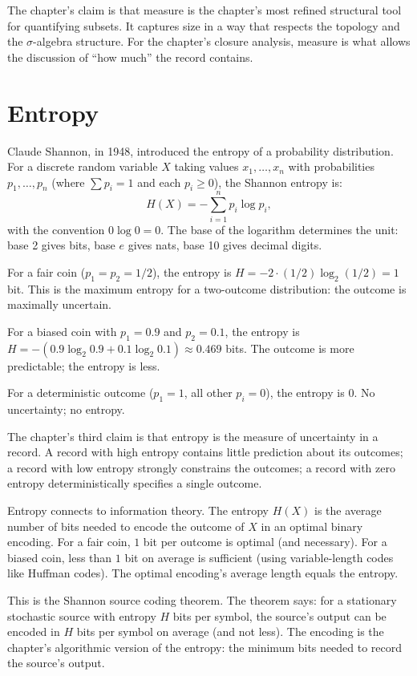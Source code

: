 The chapter's claim is that measure is the chapter's most
refined structural tool for quantifying subsets. It captures
size in a way that respects the topology and the
$\sigma$-algebra structure. For the chapter's closure
analysis, measure is what allows the discussion of ``how
much'' the record contains.

\section{Entropy}
\label{se:entropy}

Claude Shannon, in 1948, introduced the entropy of a probability
distribution. For a discrete random variable $X$ taking values
$x_1, \ldots, x_n$ with probabilities $p_1, \ldots, p_n$ (where
$\sum p_i = 1$ and each $p_i \ge 0$), the Shannon entropy is:
\[
H(X) = -\sum_{i=1}^n p_i \log p_i,
\]
with the convention $0 \log 0 = 0$. The base of the logarithm
determines the unit: base 2 gives bits, base $e$ gives nats, base
10 gives decimal digits.

For a fair coin ($p_1 = p_2 = 1/2$), the entropy is $H = -2 \cdot
(1/2) \log_2(1/2) = 1$ bit. This is the maximum entropy for a
two-outcome distribution: the outcome is maximally uncertain.

For a biased coin with $p_1 = 0.9$ and $p_2 = 0.1$, the entropy
is $H = -(0.9 \log_2 0.9 + 0.1 \log_2 0.1) \approx 0.469$ bits.
The outcome is more predictable; the entropy is less.

For a deterministic outcome ($p_1 = 1$, all other $p_i = 0$), the
entropy is $0$. No uncertainty; no entropy.

The chapter's third claim is that entropy is the measure of
uncertainty in a record. A record with high entropy contains
little prediction about its outcomes; a record with low entropy
strongly constrains the outcomes; a record with zero entropy
deterministically specifies a single outcome.

Entropy connects to information theory. The entropy $H(X)$ is the
average number of bits needed to encode the outcome of $X$ in an
optimal binary encoding. For a fair coin, $1$ bit per outcome is
optimal (and necessary). For a biased coin, less than $1$ bit on
average is sufficient (using variable-length codes like
Huffman codes). The optimal encoding's average length equals the
entropy.

This is the Shannon source coding theorem. The theorem says: for
a stationary stochastic source with entropy $H$ bits per
symbol, the source's output can be encoded in $H$ bits per
symbol on average (and not less). The encoding is the
chapter's algorithmic version of the entropy: the minimum bits
needed to record the source's output.


